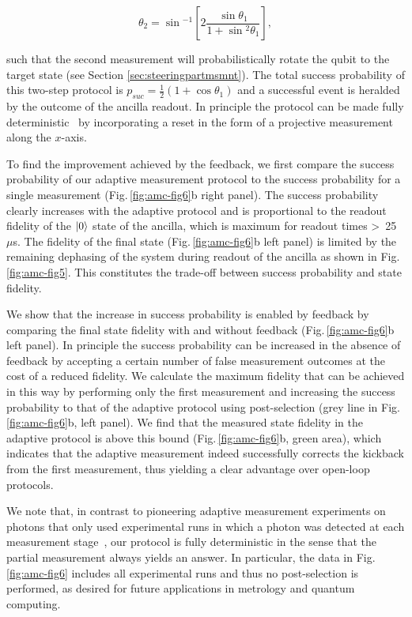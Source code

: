 \begin{equation}
\theta_2 = \sin{^{-1}\left[2 \frac{\sin{\theta_1}}{1 + \sin{^2 \theta_1}}\right]},
\end{equation}

such that the second measurement will probabilistically rotate the qubit to the target state (see Section \ref{sec:steeringpartmsmnt}). The total success probability of this two-step protocol is  $p_{suc} = \frac{1}{2}(1 + \cos{\theta_1})$ and a successful event is heralded by the outcome of the ancilla readout. In principle the protocol can be made fully deterministic~\cite{Ashhab_PhysRevA_2010} by incorporating a reset in the form of a projective measurement along the $x$-axis.

To find the improvement achieved by the feedback, we first compare the success probability of our adaptive measurement protocol to the success probability for a single measurement (Fig.\,\ref{fig:amc-fig6}b right panel). The success probability clearly increases with the adaptive protocol and is proportional to the readout fidelity of the $\left|0\right>$ state of the ancilla, which is maximum for readout times  \textgreater~25~$\mu$s. The fidelity of the final state (Fig.\,\ref{fig:amc-fig6}b left panel) is limited by the remaining dephasing of the system during readout of the ancilla as shown in Fig.\,\ref{fig:amc-fig5}. This constitutes the trade-off between success probability and state fidelity. 

We show that the increase in success probability is enabled by feedback by comparing the final state fidelity with and without feedback (Fig.\,\ref{fig:amc-fig6}b left panel). In principle the success probability can be increased in the absence of feedback by accepting a certain number of false measurement outcomes at the cost of a reduced fidelity. We calculate the maximum fidelity that can be achieved in this way by performing only the first measurement and increasing the success probability to that of the adaptive protocol using post-selection (grey line in Fig.\,\ref{fig:amc-fig6}b, left panel). We find that the measured state fidelity in the adaptive protocol is above this bound (Fig.\,\ref{fig:amc-fig6}b, green area), which indicates that the adaptive measurement indeed successfully corrects the kickback from the first measurement, thus yielding a clear advantage over open-loop protocols.



We note that, in contrast to pioneering adaptive measurement experiments on photons that only used experimental runs in which a photon was detected at each measurement stage~\cite{Prevedel_Nature_2007}, our protocol is fully deterministic in the sense that the partial measurement always yields an answer. In particular, the data in Fig.\,\ref{fig:amc-fig6} includes all experimental runs and thus no post-selection is performed, as desired for future applications in metrology and quantum computing. 

